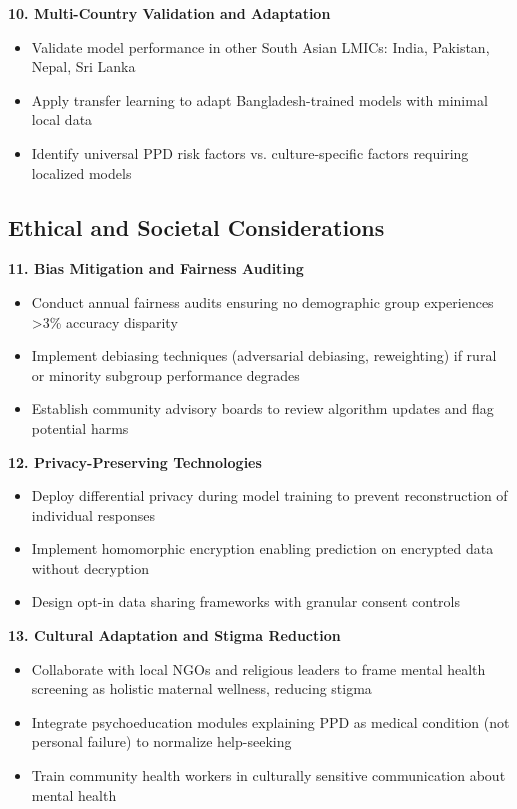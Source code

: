 \textbf{10. Multi-Country Validation and Adaptation}
\begin{itemize}
    \item Validate model performance in other South Asian LMICs: India, Pakistan, Nepal, Sri Lanka
    \item Apply transfer learning to adapt Bangladesh-trained models with minimal local data
    \item Identify universal PPD risk factors vs. culture-specific factors requiring localized models
\end{itemize}

\subsection{Ethical and Societal Considerations}

\textbf{11. Bias Mitigation and Fairness Auditing}
\begin{itemize}
    \item Conduct annual fairness audits ensuring no demographic group experiences >3\% accuracy disparity
    \item Implement debiasing techniques (adversarial debiasing, reweighting) if rural or minority subgroup performance degrades
    \item Establish community advisory boards to review algorithm updates and flag potential harms
\end{itemize}

\textbf{12. Privacy-Preserving Technologies}
\begin{itemize}
    \item Deploy differential privacy during model training to prevent reconstruction of individual responses
    \item Implement homomorphic encryption enabling prediction on encrypted data without decryption
    \item Design opt-in data sharing frameworks with granular consent controls
\end{itemize}

\textbf{13. Cultural Adaptation and Stigma Reduction}
\begin{itemize}
    \item Collaborate with local NGOs and religious leaders to frame mental health screening as holistic maternal wellness, reducing stigma
    \item Integrate psychoeducation modules explaining PPD as medical condition (not personal failure) to normalize help-seeking
    \item Train community health workers in culturally sensitive communication about mental health
\end{itemize}

